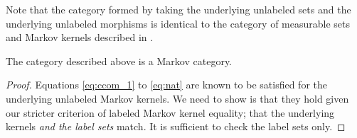Note that the category formed by taking the underlying unlabeled sets and the underlying unlabeled morphisms is identical to the category of measurable sets and Markov kernels described in \citet{fong_causal_2013,cho_disintegration_2019,fritz_synthetic_2020}.

\begin{theorem}
The category described above is a Markov category.
\end{theorem}

\begin{proof}


Equations \ref{eq:ccom_1} to \ref{eq:nat} are known to be satisfied for the underlying unlabeled Markov kernels. We need to show is that they hold given our stricter criterion of labeled Markov kernel equality; that the underlying kernels \emph{and the label sets} match. It is sufficient to check the label sets only.



\end{proof}